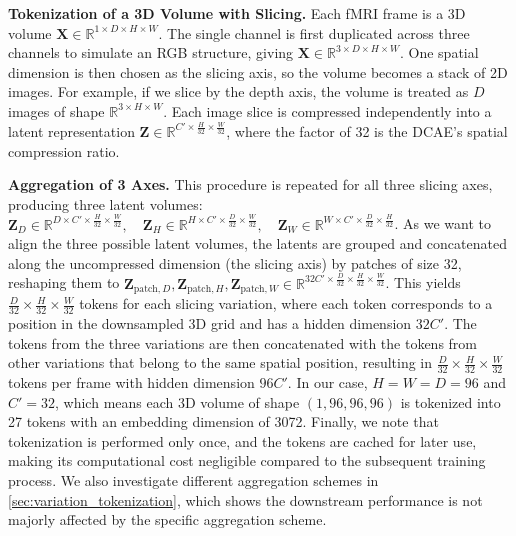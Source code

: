 \noindent \textbf{Tokenization of a 3D Volume with Slicing.}  
Each fMRI frame is a 3D volume $\mathbf{X} \in \mathbb{R}^{1 \times D \times H \times W}$. The single channel is first duplicated across three channels to simulate an RGB structure, giving $\mathbf{X} \in \mathbb{R}^{3 \times D \times H \times W}$. One spatial dimension is then chosen as the slicing axis, so the volume becomes a stack of 2D images. For example, if we slice by the depth axis, the volume is treated as $D$ images of shape $\mathbb{R}^{3 \times H \times W}$. Each image slice is compressed independently into a latent representation $\mathbf{Z} \in \mathbb{R}^{C' \times \frac{H}{32} \times \frac{W}{32}}$, where the factor of 32 is the DCAE's spatial compression ratio.  

\noindent \textbf{Aggregation of 3 Axes.}  
This procedure is repeated for all three slicing axes, producing three latent volumes: $\mathbf{Z}_D \in \mathbb{R}^{D \times C' \times \frac{H}{32} \times \frac{W}{32}}, \quad
\mathbf{Z}_H \in \mathbb{R}^{H \times C' \times \frac{D}{32} \times \frac{W}{32}}, \quad
\mathbf{Z}_W \in \mathbb{R}^{W \times C' \times \frac{D}{32} \times \frac{H}{32}}$. As we want to align the three possible latent volumes, the latents are grouped and concatenated along the uncompressed dimension (the slicing axis) by patches of size 32, reshaping them to $\mathbf{Z}_{\text{patch},D}, \mathbf{Z}_{\text{patch},H}, \mathbf{Z}_{\text{patch},W} \in \mathbb{R}^{32C' \times \frac{D}{32} \times \frac{H}{32} \times \frac{W}{32}}$.
This yields $\frac{D}{32} \times \frac{H}{32} \times \frac{W}{32}$ tokens for each slicing variation, where each token corresponds to a position in the downsampled 3D grid and has a hidden dimension $32C'$. The tokens from the three variations are then concatenated with the tokens from other variations that belong to the same spatial position, resulting in $\frac{D}{32} \times \frac{H}{32} \times \frac{W}{32}$ tokens per frame with hidden dimension $96C'$. In our case, $H = W = D = 96$ and $C' = 32$, which means each 3D volume of shape $(1, 96, 96, 96)$ is tokenized into 27 tokens with an embedding dimension of 3072. 
Finally, we note that tokenization is performed only once, and the tokens are cached for later use, making its computational cost negligible compared to the subsequent training process.
We also investigate different aggregation schemes in \cref{sec:variation_tokenization}, which shows the downstream performance is not majorly affected by the specific aggregation scheme.

